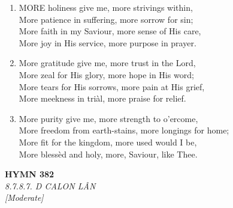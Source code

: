 \documentclass[11pt,a4paper]{article}
\begin{document}
\begin{enumerate}
    \item MORE holiness give me, more strivings within, \\
        More patience in suffering, more sorrow for sin; \\
        More faith in my Saviour, more sense of His care, \\
        More joy in His service, more purpose in prayer.

    \item More gratitude give me, more trust in the Lord, \\
        More zeal for His glory, more hope in His word; \\
        More tears for His sorrows, more pain at His grief, \\
        More meekness in tri\`al, more praise for relief.

    \item More purity give me, more strength to o'ercome, \\
        More freedom from earth-stains, more longings for home; \\
        More fit for the kingdom, more used would I be, \\
        More bless\`ed and holy, more, Saviour, like Thee.

\end{enumerate}

\newpage
\begin{center}
    {\Large \textbf{HYMN 382}}
    \\
    \textit{8.7.8.7. D CALON L\^{A}N}
    \\
    \textit{\small [Moderate]}
\end{center}
\vspace{1em}
\end{document}
